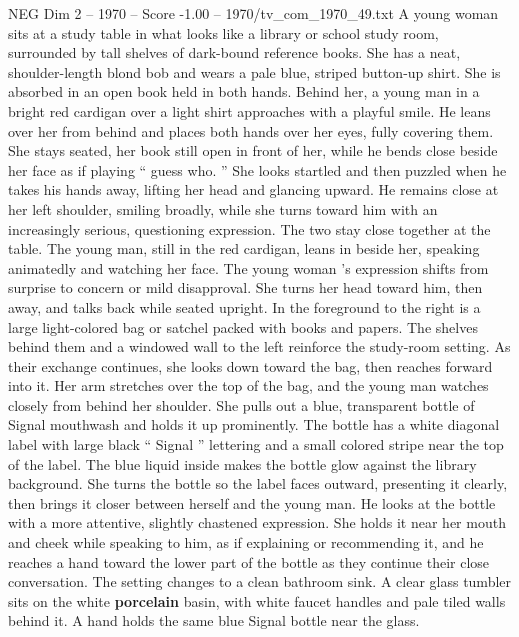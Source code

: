 \begin{textsample}{NEG Dim 2 – 1970 – Score -1.00 – 1970/tv\_com\_1970\_49.txt}  \label{ex:f2_neg_022}
A young woman sits at a study table in what looks like a library or school study room, surrounded by tall shelves of dark-bound reference books.
She has a neat, shoulder-length blond bob and wears a pale blue, striped button-up shirt.
She is absorbed in an open book held in both hands.
Behind her, a young man in a bright red cardigan over a light shirt approaches with a playful smile.
He leans over her from behind and places both hands over her eyes, fully covering them.
She stays seated, her book still open in front of her, while he bends close beside her face as if playing “ guess who. ” She looks startled and then puzzled when he takes his hands away, lifting her head and glancing upward.
He remains close at her left shoulder, smiling broadly, while she turns toward him with an increasingly serious, questioning expression.
The two stay close together at the table.
The young man, still in the red cardigan, leans in beside her, speaking animatedly and watching her face.
The young woman ’s expression shifts from surprise to concern or mild disapproval.
She turns her head toward him, then away, and talks back while seated upright.
In the foreground to the right is a large light-colored bag or satchel packed with books and papers.
The shelves behind them and a windowed wall to the left reinforce the study-room setting.
As their exchange continues, she looks down toward the bag, then reaches forward into it.
Her arm stretches over the top of the bag, and the young man watches closely from behind her shoulder.
She pulls out a blue, transparent bottle of Signal mouthwash and holds it up prominently.
The bottle has a white diagonal label with large black “ Signal ” lettering and a small colored stripe near the top of the label.
The blue liquid inside makes the bottle glow against the library background.
She turns the bottle so the label faces outward, presenting it clearly, then brings it closer between herself and the young man.
He looks at the bottle with a more attentive, slightly chastened expression.
She holds it near her mouth and cheek while speaking to him, as if explaining or recommending it, and he reaches a hand toward the lower part of the bottle as they continue their close conversation.
The setting changes to a clean bathroom sink.
A clear glass tumbler sits on the white \textbf{porcelain} basin, with white faucet handles and pale tiled walls behind it.
A hand holds the same blue Signal bottle near the glass.

\end{textsample}
